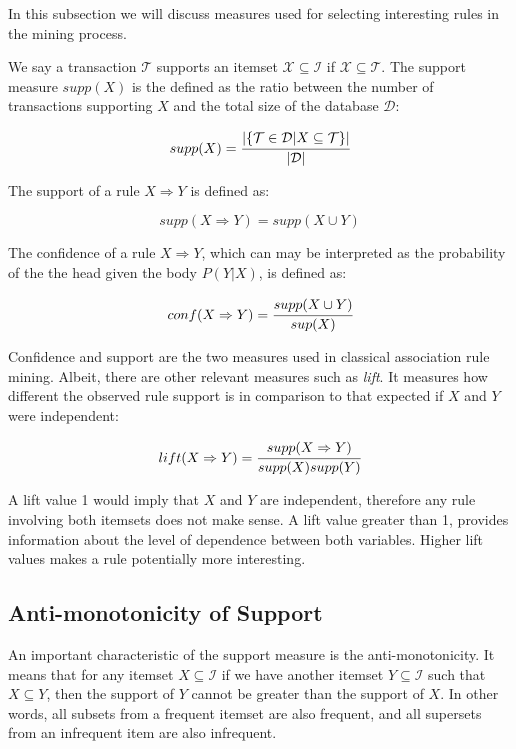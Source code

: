 In this subsection we will discuss measures used for selecting interesting rules in the mining process.

We say a transaction $\mathcal{T}$ supports an itemset $\mathcal{X} \subseteq \mathcal{I}$ if $\mathcal{X} \subseteq
\mathcal{T}$. The support measure $supp(X)$ is the defined as the ratio between the number of transactions supporting
$X$ and the total size of the database $\mathcal{D}$:

\begin{equation}
 supp(X)=\cfrac{|\{ \mathcal{T} \in \mathcal{D} | X \subseteq \mathcal{T} \}|}{|\mathcal{D}|}
\end{equation}

The support of a rule $X \Rightarrow Y$ is defined as:

\begin{equation}
 supp(X \Rightarrow Y)=supp(X \cup Y)
\end{equation}

The confidence of a rule $X \Rightarrow Y$, which can may be interpreted as the probability of the the head given the
body $P(Y|X)$, is defined as:

\begin{equation}
 conf(X \Rightarrow Y)=\cfrac{supp(X \cup Y)}{sup(X)}
\end{equation}

Confidence and support are the two measures used in classical association rule mining. Albeit, there are other
relevant
measures such as \emph{lift}. It measures how different the observed rule support is in comparison to that expected if
$X$ and $Y$ were independent:

\begin{equation}
 lift(X \Rightarrow Y)=\cfrac{supp(X \Rightarrow Y)}{supp(X)supp(Y)}
\end{equation}

A lift value 1 would imply that $X$ and $Y$ are independent, therefore any rule involving both itemsets does not make
sense. A lift value greater than 1, provides information about the level of dependence between both variables. Higher
lift values makes a rule potentially more interesting.

\subsection{Anti-monotonicity of Support}

An important characteristic of the support measure is the anti-monotonicity. It means that for any itemset $X
\subseteq \mathcal{I}$ if we have another itemset $Y \subseteq \mathcal{I}$ such that $X \subseteq Y$, then the
support
of $Y$ cannot be greater than the support of $X$. In other words, all subsets from a frequent itemset are also
frequent,
and all supersets from an infrequent item are also infrequent.

